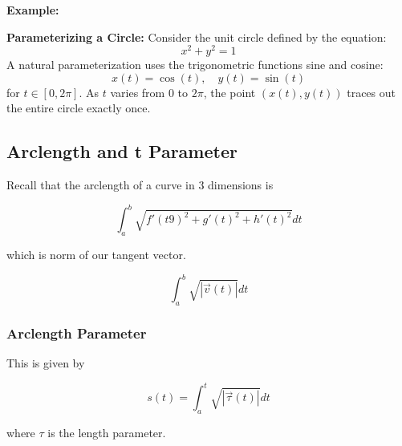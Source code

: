 \textbf{Example:}
\vspace{\baselineskip}

\textbf{Parameterizing a Circle:}  
Consider the unit circle defined by the equation:
\[
x^2 + y^2 = 1
\]
A natural parameterization uses the trigonometric functions sine and cosine:
\[
x(t) = \cos(t), \quad y(t) = \sin(t)
\]
for \( t \in [0, 2\pi] \).  
As \( t \) varies from \( 0 \) to \( 2\pi \), the point \( (x(t), y(t)) \) traces out the entire circle exactly once.

\subsection{Arclength and t Parameter}

Recall that the arclength of a curve in 3 dimensions is

\[
\int_{a}^{b} \sqrt{{f'(t9)}^2 + {g'(t)}^2 + {h'(t)}^2} dt
\]

which is norm of our tangent vector.

\[
\int_{a}^{b} \sqrt{|\vec{v}(t)|} dt
\]

\subsubsection{Arclength Parameter}

This is given by

\[
s(t) = \int_{a}^{t} \sqrt{|\vec{\tau}(t)|} dt
\]

where \(\tau\) is the length parameter.

